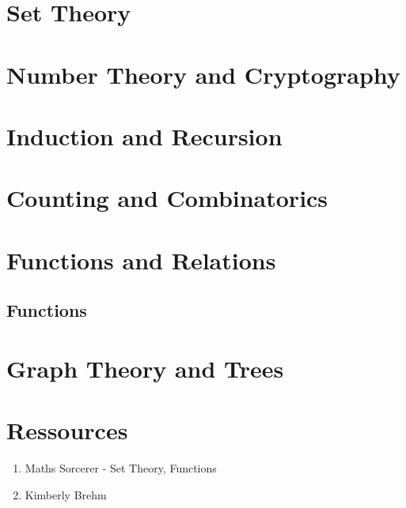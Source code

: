 \documentclass{article}
\begin{document}
\section{Set Theory}




\section{Number Theory and Cryptography}

\section{Induction and Recursion}

\section{Counting and Combinatorics}

\section{Functions and Relations}%
\label{sec:Functions and Relations}

\subsection{Functions}%
\label{sub:Functions}

\begin{defintion}[Functions]
\end{defintion}



\section{Graph Theory and Trees}

\section{Ressources}%
\label{sec:Ressources}

\begin{enumerate}
    \item Maths Sorcerer - Set Theory, Functions
    \item Kimberly Brehm
\end{enumerate}
\end{document}

